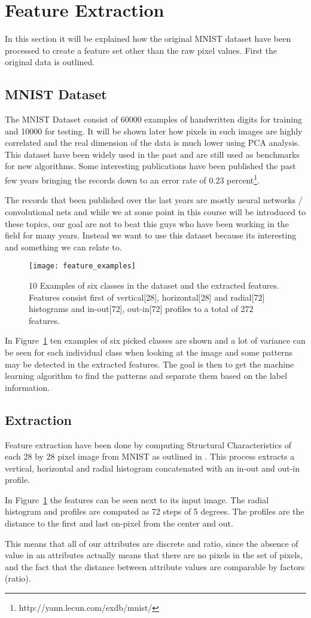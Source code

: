 \section{Feature Extraction}
In this section it will be explained how the original MNIST dataset have been processed to create a feature set other than the raw pixel values. First the original data is outlined.
\subsection{MNIST Dataset}
The MNIST Dataset consist of 60000 examples of handwritten digits for training and 10000 for testing. It will be shown later how pixels in such images are highly correlated and the real dimension of the data is much lower using PCA analysis.
This dataset have been widely used in the past and are still used as benchmarks for new algorithms. Some interesting publications have been published the past few years bringing the records down to an error rate of 0.23 percent\footnote{http://yann.lecun.com/exdb/mnist/}.

The records that been published over the last years are mostly neural networks / convolutional  nets and while we at some point in this course will be introduced to these topics, our goal are not to beat this guys who have been working in the field for many years. Instead we want to use this dataset because its interesting and something we can relate to.


\begin{figure}[hbtp]
\centering
\texttt{[image: feature\_examples]}
\caption{10 Examples of six classes in the dataset and the extracted features. Features consist first of vertical[28], horizontal[28] and radial[72] histograms and in-out[72], out-in[72] profiles to a total of 272 features. \label{fig:image_examples}}
\end{figure}

In Figure~\ref{fig:image_examples} ten examples of six picked classes are shown and a lot of variance can be seen for each individual class when looking at the image and some patterns may be detected in the extracted features. The goal is then to get the machine learning algorithm to find the patterns and separate them based on the label information.
\subsection{Extraction}
Feature extraction have been done by computing Structural Characteristics of each 28 by 28 pixel image from MNIST as outlined in \cite{1227727}. This process extracts a vertical, horizontal and radial histogram concatenated with an in-out and out-in profile.

In Figure~\ref{fig:image_examples} the features can be seen next to its input image. The radial histogram and profiles are computed as 72 steps of 5 degrees. The profiles are the distance to the first and last on-pixel from the center and out. 

This means that all of our attributes are discrete and ratio, since the absence of value in an attributes actually means that there are no pixels in the set of pixels, and the fact that the distance between attribute values are comparable by factors (ratio).
